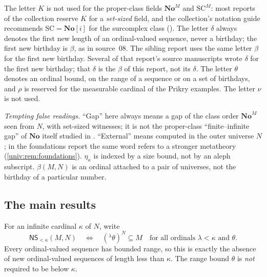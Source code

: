 \documentclass[11pt,letterpaper]{article}
\numberwithin{equation}{section}
\theoremstyle{definition}
\theoremstyle{remark}
\newcommand{\No}{\mathbf{No}}
\newcommand{\SC}{\mathrm{SC}}
\newcommand{\NoM}{\No^{M}}
\newcommand{\SCM}{\SC^{M}}
\newcommand{\NS}{\mathsf{NS}}
\begin{document}
The letter $K$ is not used for the proper-class fields $\NoM$ and $\SCM$:
most reports of the collection reserve $K$ for a \emph{set-sized} field, and
the collection's notation guide recommends $\SC=\No[i]$ for the surcomplex
class (). The letter $\delta$ always denotes the first
new length of an ordinal-valued sequence, never a birthday; the first new
birthday is $\beta$, as in source~08. The sibling report
uses the same letter $\beta$ for the first new birthday. Several of that
report's source manuscripts wrote $\delta$ for the first new birthday; that
$\delta$ is the $\beta$ of this report, not its $\delta$. The
letter $\theta$ denotes an ordinal bound, on the range of a sequence or on a
set of birthdays, and $\rho$ is reserved for the measurable cardinal of the
Prikry examples. The letter $\nu$ is not used.

\emph{Tempting false readings.} ``Gap'' here always means a gap of the class
order $\NoM$ seen from $N$, with set-sized witnesses; it is not the
proper-class ``finite--infinite gap'' of $\No$ itself studied in
. ``External'' means computed
in the outer universe $N$; in the foundations report the same word refers to
a stronger metatheory (\cref{univ:rem:foundations}). $\eta_\kappa$ is indexed
by a size bound, not by an aleph subscript. $\beta(M,N)$ is an ordinal
attached to a pair of universes, not the birthday of a particular number.

\subsection{The main results}\label{univ:sub:main}

For an infinite cardinal $\kappa$ of $N$, write
\begin{equation}\label{univ:eq:NSdef}
 \NS_{<\kappa}(M,N)
 \quad\Longleftrightarrow\quad
 ({}^\lambda\theta)^N\subseteq M
 \quad\text{for all ordinals }\lambda<\kappa\text{ and }\theta.
\end{equation}
Every ordinal-valued sequence has bounded range, so this is exactly the
absence of new ordinal-valued sequences of length less than $\kappa$.
The range bound $\theta$ is \emph{not} required to be below $\kappa$.
\end{document}
